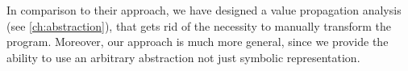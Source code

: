 In comparison to their approach, we have designed a value propagation analysis
(see \autoref{ch:abstraction}), that gets rid of the necessity to manually transform
the program. Moreover, our approach is much more general, since we provide the ability to use an arbitrary abstraction not just symbolic representation.


